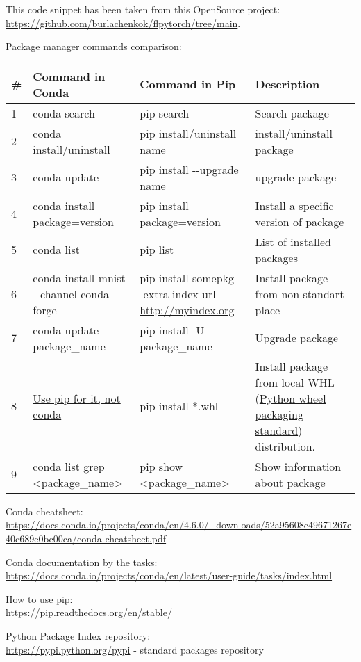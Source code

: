 \documentclass[
]{article}
\begin{document}
This code snippet has been taken from this OpenSource project:
\url{https://github.com/burlachenkok/flpytorch/tree/main}.

Package manager commands comparison:

\begin{longtable}[]{@{}llll@{}}
\toprule
\# & \textbf{Command in Conda} & \textbf{Command in Pip} &
\textbf{Description} \\
\midrule
\endhead
1 & conda search & pip search & Search package \\
2 & conda install/uninstall & pip install/uninstall name &
install/uninstall package \\
3 & conda update & pip install -\/-upgrade name & upgrade package \\
4 & conda install package=version & pip install package=version &
Install a specific version of package \\
5 & conda list & pip list & List of installed packages \\
6 & conda install mnist -\/-channel conda-forge & pip install somepkg
-\/-extra-index-url \url{http://myindex.org} & Install package from
non-standart place \\
7 & conda update package\_name & pip install -U package\_name & Upgrade
package \\
8 &
\href{https://docs.conda.io/projects/conda-build/en/latest/user-guide/wheel-files.html}{Use
pip for it, not conda} & pip install *.whl & Install package from local
WHL
(\href{https://packaging.python.org/en/latest/specifications/binary-distribution-format/}{Python
wheel packaging standard}) distribution. \\
9 & conda list \textbar{} grep \textless package\_name\textgreater{} &
pip show \textless package\_name\textgreater{} & Show information about
package \\
\bottomrule
\end{longtable}

Conda cheatsheet:\\
\url{https://docs.conda.io/projects/conda/en/4.6.0/_downloads/52a95608c49671267e40c689e0bc00ca/conda-cheatsheet.pdf}

Conda documentation by the tasks:\\
\url{https://docs.conda.io/projects/conda/en/latest/user-guide/tasks/index.html}

How to use pip:\\
\url{https://pip.readthedocs.org/en/stable/}

Python Package Index repository:\\
\url{https://pypi.python.org/pypi} - standard packages repository
\end{document}
